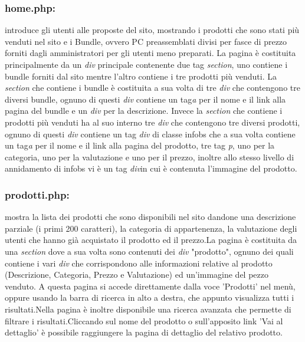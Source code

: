  \subsubsection{home.php:} \Spazio introduce gli utenti alle proposte del sito, mostrando i prodotti che sono stati più venduti nel sito e i Bundle, ovvero PC preassemblati divisi per fasce di prezzo forniti dagli amministratori per gli utenti meno preparati.
 La pagina è costituita principalmente da un \emph{div} principale contenente due tag \emph{section}, uno contiene i bundle forniti dal sito mentre l'altro contiene i tre prodotti più venduti. 
 La \emph{section} che contiene i bundle è costituita a sua volta di tre \emph{div} che contengono tre diversi bundle, ognuno di questi \emph{div} contiene un tag\emph{a} per il nome e il link alla pagina del bundle e un \emph{div} per la descrizione.
 Invece la \emph{section} che contiene i prodotti più venduti ha al suo interno tre \emph{div} che contengono tre diversi prodotti, ognuno di questi \emph{div} contiene un tag \emph{div} di classe infobs che a sua volta contiene un tag\emph{a} per il nome e il link alla pagina del prodotto, tre tag \emph{p}, uno per la categoria, uno per la valutazione e uno per il prezzo, inoltre allo stesso livello di annidamento di infobs vi è un tag \emph{div}in cui è contenuta l'immagine del prodotto.
 
\subsubsection{prodotti.php:} \Spazio mostra la lista dei prodotti che sono disponibili nel sito dandone una descrizione parziale (i primi 200 caratteri), la categoria di appartenenza, la valutazione degli utenti che hanno già acquistato il prodotto ed il prezzo.\newline La pagina è costituita da una \emph{section} dove a sua volta sono contenuti dei \emph{div} "prodotto", ognuno dei quali contiene i vari \emph{div} che corrispondono alle informazioni relative al prodotto (Descrizione, Categoria, Prezzo e Valutazione) ed un'immagine del pezzo venduto. A questa pagina si accede direttamente dalla voce 'Prodotti' nel menù, oppure usando la barra di ricerca in alto a destra, che appunto visualizza tutti i risultati.\newline Nella pagina è inoltre disponibile una ricerca avanzata che permette di filtrare i risultati.\newline Cliccando sul nome del prodotto o sull'apposito link 'Vai al dettaglio' è possibile raggiungere la pagina di dettaglio del relativo prodotto.

